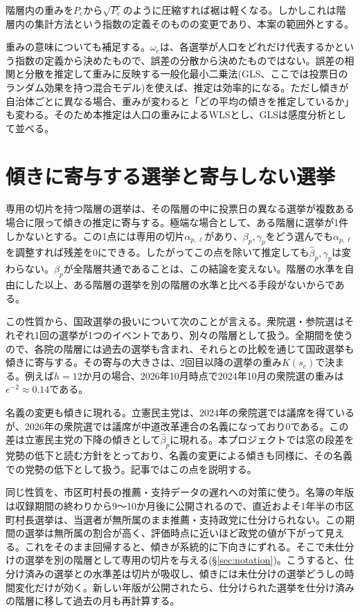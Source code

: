 \documentclass[a4paper,11pt]{ltjsarticle}
\begin{document}
階層内の重みを$P_e$から$\sqrt{P_e}$のように圧縮すれば裾は軽くなる。しかしこれは階層内の集計方法という指数の定義そのものの変更であり、本案の範囲外とする。

重みの意味についても補足する。$\omega_e$は、各選挙が人口をどれだけ代表するかという指数の定義から決めたもので、誤差の分散から決めたものではない。誤差の相関と分散を推定して重みに反映する一般化最小二乗法(GLS、ここでは投票日のランダム効果を持つ混合モデル)を使えば、推定は効率的になる。ただし傾きが自治体ごとに異なる場合、重みが変わると「どの平均の傾きを推定しているか」も変わる。そのため本推定は人口の重みによるWLSとし、GLSは感度分析として並べる。

\section{傾きに寄与する選挙と寄与しない選挙}
\label{sec:contribution}

専用の切片を持つ階層の選挙は、その階層の中に投票日の異なる選挙が複数ある場合に限って傾きの推定に寄与する。極端な場合として、ある階層に選挙が1件しかないとする。この1点には専用の切片$\alpha_{p,\ell}$があり、$\beta_p,\gamma_p$をどう選んでも$\alpha_{p,\ell}$を調整すれば残差を0にできる。したがってこの点を除いて推定しても$\hat\beta_p,\hat\gamma_p$は変わらない。$\beta_p$が全階層共通であることは、この結論を変えない。階層の水準を自由にした以上、ある階層の選挙を別の階層の水準と比べる手段がないからである。

この性質から、国政選挙の扱いについて次のことが言える。衆院選・参院選はそれぞれ1回の選挙が1つのイベントであり、別々の階層として扱う。全期間を使うので、各院の階層には過去の選挙も含まれ、それらとの比較を通じて国政選挙も傾きに寄与する。その寄与の大きさは、2回目以降の選挙の重み$K(s_e)$で決まる。例えば$h=12$か月の場合、2026年10月時点で2024年10月の衆院選の重みは$e^{-2}\approx0.14$である。

名義の変更も傾きに現れる。立憲民主党は、2024年の衆院選では議席を得ているが、2026年の衆院選では議席が中道改革連合の名義になっており0である。この差は立憲民主党の下降の傾きとして$\hat\beta_p$に現れる。本プロジェクトでは窓の段差を党勢の低下と読む方針をとっており、名義の変更による傾きも同様に、その名義での党勢の低下として扱う。記事ではこの点を説明する。

同じ性質を、市区町村長の推薦・支持データの遅れへの対策に使う。名簿の年版は収録期間の終わりから9〜10か月後に公開されるので、直近およそ1年半の市区町村長選挙は、当選者が無所属のまま推薦・支持政党に仕分けられない。この期間の選挙は無所属の割合が高く、評価時点に近いほど政党の値が下がって見える。これをそのまま回帰すると、傾きが系統的に下向きにずれる。そこで未仕分けの選挙を別の階層として専用の切片を与える(\S\ref{sec:notation})。こうすると、仕分け済みの選挙との水準差は切片が吸収し、傾きには未仕分けの選挙どうしの時間変化だけが効く。新しい年版が公開されたら、仕分けられた選挙を仕分け済みの階層に移して過去の月も再計算する。
\end{document}
